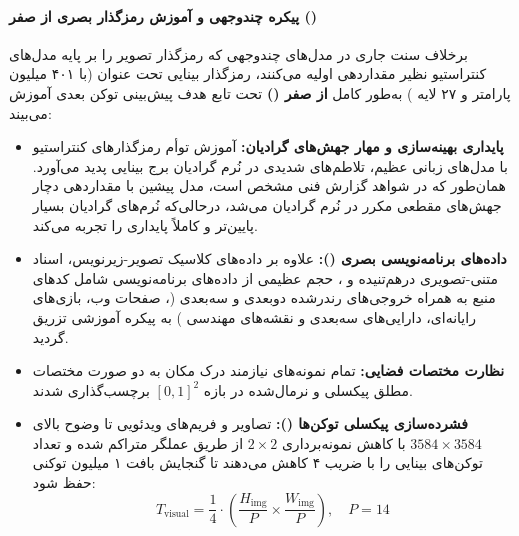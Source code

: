 \paragraph*{پیکره چندوجهی و آموزش رمزگذار بصری از صفر ()}
برخلاف سنت جاری در مدل‌های چندوجهی که رمزگذار تصویر را بر پایه مدل‌های کنتراستیو نظیر  مقداردهی اولیه می‌کنند، رمزگذار بینایی  تحت عنوان  (با ۴۰۱ میلیون پارامتر و ۲۷ لایه ) به‌طور کامل \textbf{از صفر ()} تحت تابع هدف پیش‌بینی توکن بعدی آموزش می‌بیند:
\begin{itemize}
    \item \textbf{پایداری بهینه‌سازی و مهار جهش‌های گرادیان:} آموزش توأم رمزگذارهای کنتراستیو با مدل‌های زبانی عظیم، تلاطم‌های شدیدی در نُرم گرادیان برج بینایی پدید می‌آورد. همان‌طور که در شواهد گزارش فنی مشخص است، مدل پیشین با مقداردهی  دچار جهش‌های مقطعی مکرر در نُرم گرادیان می‌شد، درحالی‌که  نُرم‌های گرادیان بسیار پایین‌تر و کاملاً پایداری را تجربه می‌کند.
    \item \textbf{داده‌های برنامه‌نویسی بصری ():} علاوه بر داده‌های کلاسیک تصویر-زیرنویس، اسناد متنی-تصویری درهم‌تنیده و ، حجم عظیمی از داده‌های برنامه‌نویسی شامل کدهای منبع به همراه خروجی‌های رندرشده دوبعدی و سه‌بعدی (، صفحات وب، بازی‌های رایانه‌ای، دارایی‌های سه‌بعدی و نقشه‌های مهندسی ) به پیکره آموزشی تزریق گردید.
    \item \textbf{نظارت مختصات فضایی:} تمام نمونه‌های نیازمند درک مکان به دو صورت مختصات مطلق پیکسلی و نرمال‌شده در بازه $[0, 1]^2$ برچسب‌گذاری شدند.
    \item \textbf{فشرده‌سازی پیکسلی توکن‌ها ():} تصاویر و فریم‌های ویدئویی تا وضوح بالای $3584 \times 3584$ با کاهش نمونه‌برداری $2 \times 2$ از طریق عملگر  متراکم شده و تعداد توکن‌های بینایی را با ضریب ۴ کاهش می‌دهند تا گنجایش بافت ۱ میلیون توکنی حفظ شود:
    \begin{equation}
        T_{\text{visual}} = \frac{1}{4} \cdot \left( \frac{H_{\text{img}}}{P} \times \frac{W_{\text{img}}}{P} \right), \quad P = 14
    \end{equation}
\end{itemize}

